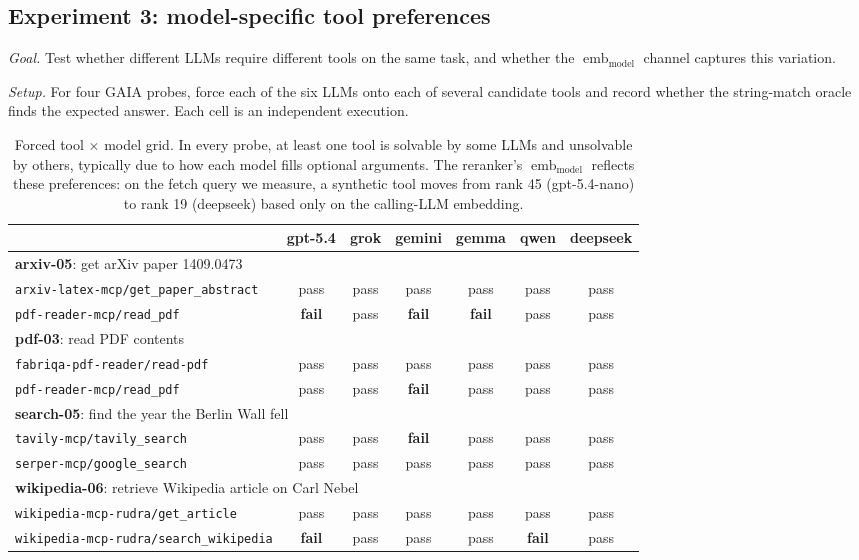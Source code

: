 \subsection{Experiment 3: model-specific tool preferences}
\label{sec:exp3}

\textit{Goal.} Test whether different LLMs require different tools on the same task, and whether the $\operatorname{emb}_{\text{model}}$ channel captures this variation.

\textit{Setup.} For four GAIA probes, force each of the six LLMs onto each of several candidate tools and record whether the string-match oracle finds the expected answer. Each cell is an independent execution.

\begin{table}[h]
\centering
\small
\begin{tabular}{lcccccc}
\toprule
 & gpt-5.4 & grok & gemini & gemma & qwen & deepseek \\
\midrule
\multicolumn{7}{l}{\textbf{arxiv-05}: get arXiv paper 1409.0473} \\
\texttt{arxiv-latex-mcp/get\_paper\_abstract} & pass & pass & pass & pass & pass & pass \\
\texttt{pdf-reader-mcp/read\_pdf}             & \textbf{fail} & pass & \textbf{fail} & \textbf{fail} & pass & pass \\
\midrule
\multicolumn{7}{l}{\textbf{pdf-03}: read PDF contents} \\
\texttt{fabriqa-pdf-reader/read-pdf} & pass & pass & pass & pass & pass & pass \\
\texttt{pdf-reader-mcp/read\_pdf}    & pass & pass & \textbf{fail} & pass & pass & pass \\
\midrule
\multicolumn{7}{l}{\textbf{search-05}: find the year the Berlin Wall fell} \\
\texttt{tavily-mcp/tavily\_search}   & pass & pass & \textbf{fail} & pass & pass & pass \\
\texttt{serper-mcp/google\_search}   & pass & pass & pass & pass & pass & pass \\
\midrule
\multicolumn{7}{l}{\textbf{wikipedia-06}: retrieve Wikipedia article on Carl Nebel} \\
\texttt{wikipedia-mcp-rudra/get\_article}      & pass & pass & pass & pass & pass & pass \\
\texttt{wikipedia-mcp-rudra/search\_wikipedia} & \textbf{fail} & pass & pass & pass & \textbf{fail} & pass \\
\bottomrule
\end{tabular}
\caption{Forced tool $\times$ model grid. In every probe, at least one tool is solvable by some LLMs and unsolvable by others, typically due to how each model fills optional arguments. The reranker's $\operatorname{emb}_{\text{model}}$ reflects these preferences: on the fetch query we measure, a synthetic tool moves from rank 45 (gpt-5.4-nano) to rank 19 (deepseek) based only on the calling-LLM embedding.}
\label{tab:exp3-grid}
\end{table}
